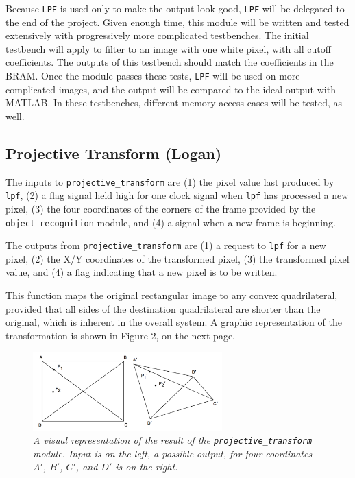 \documentclass[10pt]{article}
\begin{document}
Because {\tt LPF} is used only to make the output look good, {\tt LPF} will be delegated to the end of the project. Given enough time, this module will be written and tested extensively with progressively more complicated testbenches. The initial testbench will apply to filter to an image with one white pixel, with all cutoff coefficients. The outputs of this testbench should match the coefficients in the BRAM. Once the module passes these tests, {\tt LPF} will be used on more complicated images, and the output will be compared to the ideal output with MATLAB. In these testbenches, different memory access cases will be tested, as well.

\subsection{Projective Transform (Logan)}
The inputs to {\tt projective\_transform} are (1) the pixel value last produced by {\tt lpf}, (2) a flag signal held high for one clock signal when {\tt lpf} has processed a new pixel, (3) the four coordinates of the corners of the frame provided by the {\tt object\_recognition} module, and (4) a signal when a new frame is beginning.

The outputs from {\tt projective\_transform} are (1) a request to {\tt lpf} for a new pixel, (2) the X/Y coordinates of the transformed pixel, (3) the transformed pixel value, and (4) a flag indicating that a new pixel is to be written.

This function maps the original rectangular image to any convex quadrilateral, provided that all sides of the destination quadrilateral are shorter than the original, which is inherent in the overall system. A graphic representation of the transformation is shown in Figure 2, on the next page.

\begin{figure}[h!]
\centering
\includegraphics[width=0.65\textwidth]{arbiskew_graphic.png}
\caption{\emph{A visual representation of the result of the {\tt projective\_transform} module. Input is on the left, a possible output, for four coordinates $A\prime$, $B\prime$, $C\prime$, and $D\prime$ is on the right.}}
\end{figure}
\end{document}
